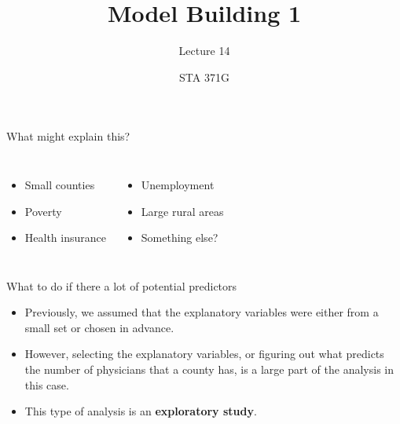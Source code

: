 \documentclass{beamer}\usepackage[]{graphicx}\usepackage[]{color}
\title{Model Building 1}
\subtitle{Lecture 14}
\author{STA 371G}
\begin{document}
  
  

  \frame{\maketitle}



  \begin{darkframes}
    
    
    \begin{frame}
    \end{frame}

    \begin{frame}{What might explain this?}
      \begin{columns}[onlytextwidth]
          \begin{itemize}
            \item Small counties
            \item Poverty
            \item Health insurance
          \end{itemize}
          \begin{itemize}
            \item Unemployment
            \item Large rural areas
            \item Something else?
          \end{itemize}
      \end{columns}
      
      \lc %
    \end{frame}

    \begin{frame}[fragile]{What to do if there a lot of potential predictors}
      \begin{itemize}[<+->]
        \item Previously, we assumed that the explanatory variables were either from a small set or chosen in advance.
        \item However, selecting the explanatory variables, or figuring out what predicts the number of physicians that a county has, is a large part of the analysis in this case.
        \item This type of analysis is an \textbf{exploratory study}.
      \end{itemize} 
    \end{frame}


\end{darkframes}
\end{document}
